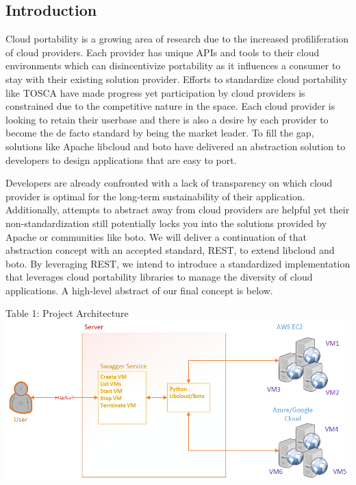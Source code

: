 \label{restful-api-service-to-enable-ease-of-portability-leveraging-botolibcloud}


\subsection{Introduction}\label{introduction}

Cloud portability is a growing area of research due to the increased
profiliferation of cloud providers. Each provider has unique APIs and
tools to their cloud environments which can disincentivize portability
as it influences a consumer to stay with their existing solution
provider. Efforts to standardize cloud portability like TOSCA have made
progress yet participation by cloud providers is constrained due to the
competitive nature in the space. Each cloud provider is looking to
retain their userbase and there is also a desire by each provider to
become the de facto standard by being the market leader. To fill the
gap, solutions like Apache libcloud and boto have delivered an
abstraction solution to developers to design applications that are easy
to port.

Developers are already confronted with a lack of transparency on which
cloud provider is optimal for the long-term sustainability of their
application. Additionally, attempts to abstract away from cloud
providers are helpful yet their non-standardization still potentially
locks you into the solutions provided by Apache or communities like
boto. We will deliver a continuation of that abstraction concept with an
accepted standard, REST, to extend libcloud and boto. By leveraging
REST, we intend to introduce a standardized implementation that
leverages cloud portability libraries to manage the diversity of cloud
applications. A high-level abstract of our final concept is below.

Table 1: Project Architecture \includegraphics{images/proj-arch.png}

